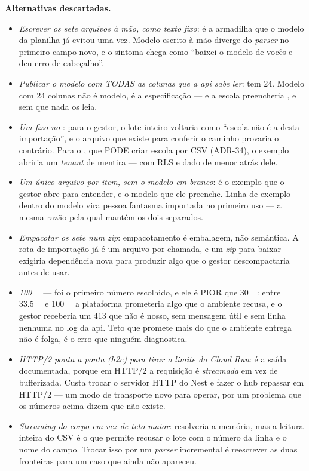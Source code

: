 \textbf{Alternativas descartadas.}
\begin{itemize}
  \item \emph{Escrever os sete arquivos à mão, como texto fixo}: é a armadilha
    que o modelo da planilha já evitou uma vez. Modelo escrito à mão diverge do
    \emph{parser} no primeiro campo novo, e o sintoma chega como ``baixei o
    modelo de vocês e deu erro de cabeçalho''.
  \item \emph{Publicar o modelo com TODAS as colunas que a api sabe ler}:
     tem 24. Modelo com 24 colunas não é modelo, é a
    especificação --- e a escola preencheria ,  e
     sem que nada os leia.
  \item \emph{Um  fixo no }: para o gestor, o lote
    inteiro voltaria como ``escola não é a desta importação'', e o arquivo que
    existe para conferir o caminho provaria o contrário. Para o
    , que PODE criar escola por CSV (ADR-34), o exemplo
    abriria um \emph{tenant} de mentira --- com RLS e dado de menor atrás dele.
  \item \emph{Um único arquivo por item, sem o modelo em branco}: é o exemplo que
    o gestor abre para entender, e o modelo que ele preenche. Linha de exemplo
    dentro do modelo vira pessoa fantasma importada no primeiro uso --- a mesma
    razão pela qual  mantém os dois separados.
  \item \emph{Empacotar os sete num \emph{zip}}: empacotamento é embalagem, não
    semântica. A rota de importação já é um arquivo por chamada, e um
    \emph{zip} para baixar exigiria dependência nova para produzir algo que o
    gestor descompactaria antes de usar.
  \item \emph{\SI{100}{\mega\byte}} --- foi o primeiro número escolhido, e ele
    é PIOR que \SI{30}{\mega\byte}: entre \SI{33.5}{\mega\byte} e
    \SI{100}{\mega\byte} a plataforma prometeria algo que o ambiente recusa, e
    o gestor receberia um 413 que não é nosso, sem mensagem útil e sem linha
    nenhuma no log da api. Teto que promete mais do que o ambiente entrega não é
    folga, é o erro que ninguém diagnostica.
  \item \emph{HTTP/2 ponta a ponta (h2c) para tirar o limite do Cloud Run}: é a
    saída documentada, porque em HTTP/2 a requisição é \emph{streamada} em vez
    de bufferizada. Custa trocar o servidor HTTP do Nest e fazer o hub repassar
    em HTTP/2 --- um modo de transporte novo para operar, por um problema que os
    números acima dizem que não existe.
  \item \emph{Streaming do corpo em vez de teto maior}: resolveria a memória, mas
    a leitura inteira do CSV é o que permite recusar o lote com o número da linha
    e o nome do campo. Trocar isso por um \emph{parser} incremental é reescrever
    as duas fronteiras para um caso que ainda não apareceu.
\end{itemize}

